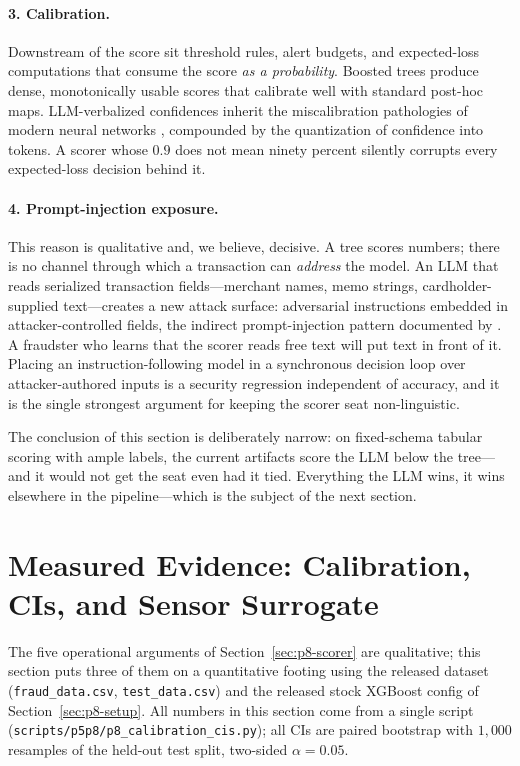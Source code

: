 \documentclass{article}
\providecommand{\secref}[1]{Section~\ref{#1}}
\begin{document}
\paragraph{3. Calibration.} Downstream of the score sit threshold rules, alert
budgets, and expected-loss computations that consume the score \emph{as a
probability}. Boosted trees produce dense, monotonically usable scores that
calibrate well with standard post-hoc maps. LLM-verbalized confidences
inherit the miscalibration pathologies of modern neural networks
\citep{guo2017calibration}, compounded by the quantization of confidence into
tokens. A scorer whose $0.9$ does not mean ninety percent silently corrupts
every expected-loss decision behind it.

\paragraph{4. Prompt-injection exposure.} This reason is qualitative and, we
believe, decisive. A tree scores numbers; there is no channel through which a
transaction can \emph{address} the model. An LLM that reads serialized
transaction fields---merchant names, memo strings, cardholder-supplied
text---creates a new attack surface: adversarial instructions embedded in
attacker-controlled fields, the indirect prompt-injection pattern documented
by \citet{greshake2023injection}. A fraudster who learns that the scorer reads
free text will put text in front of it. Placing an instruction-following model
in a synchronous decision loop over attacker-authored inputs is a security
regression independent of accuracy, and it is the single strongest argument
for keeping the scorer seat non-linguistic.

The conclusion of this section is deliberately narrow: on fixed-schema tabular
scoring with ample labels, the current artifacts score the LLM below the
tree---and it would not get the seat even had it tied. Everything the LLM wins, it wins elsewhere in the pipeline---which is the
subject of the next section.
 \section{Measured Evidence: Calibration, CIs, and Sensor Surrogate}
\label{sec:p8-evidence}

The five operational arguments of \secref{sec:p8-scorer} are
qualitative; this section puts three of them on a quantitative footing
using the released dataset (\texttt{fraud\_data.csv},
\texttt{test\_data.csv}) and the released stock XGBoost config of
\secref{sec:p8-setup}. All numbers in this section come from a single
script (\texttt{scripts/p5p8/p8\_calibration\_cis.py}); all CIs are
paired bootstrap with $1{,}000$ resamples of the held-out test split,
two-sided $\alpha{=}0.05$.
\end{document}
